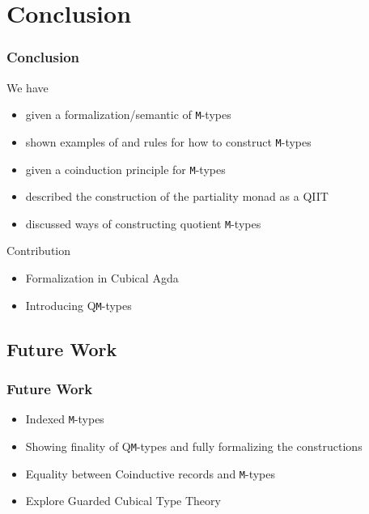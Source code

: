 \documentclass[xelatex,mathserif,serif,notheorems]{beamer} %
\theoremstyle{plain} %
\theoremstyle{definition}
\theoremstyle{remark}
\begin{document}
\section{Conclusion}
\begin{frame}
  \frametitle{Conclusion}
  We have
  \begin{itemize}
  \item given a formalization/semantic of \texttt{M}-types %
  \item shown examples of and rules for how to construct \texttt{M}-types
  \item given a coinduction principle for \texttt{M}-types
  \item described the construction of the partiality monad as a QIIT
  \item discussed ways of constructing quotient \texttt{M}-types
  \end{itemize}
  Contribution
  \begin{itemize}
  \item Formalization in Cubical Agda
  \item Introducing Q\texttt{M}-types
  \end{itemize}
\end{frame}

\subsection{Future Work}
\begin{frame}
  \frametitle{Future Work}
  \begin{itemize}
  \item Indexed \texttt{M}-types
  \item Showing finality of Q\texttt{M}-types and fully formalizing the constructions %
  \item Equality between Coinductive records and \texttt{M}-types
  \item Explore Guarded Cubical Type Theory
  \end{itemize}
\end{frame}
\end{document}
